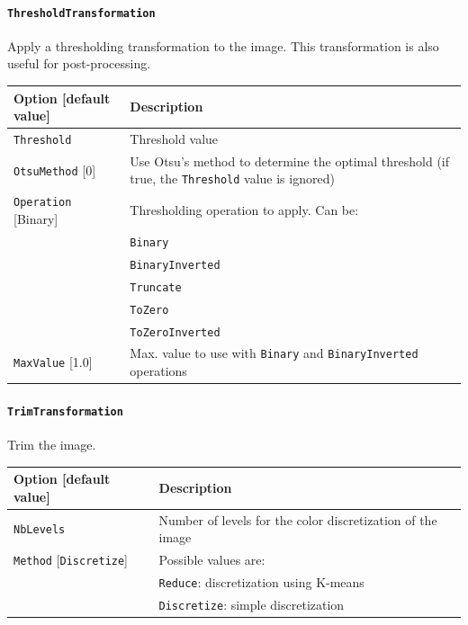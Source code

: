 \documentclass[a4paper,11pt,oneside]{article}
\begin{document}
\paragraph{\texorpdfstring{\lstinline[basicstyle=\ttfamily\bfseries]!ThresholdTransformation!}{ThresholdTransformation}}
Apply a thresholding transformation to the image.
This transformation is also useful for post-processing.

\begin{center}
 \begin{tabular}{| p{5cm} | p{10cm} | }
 \hline
 Option [default value] & Description\\
 \hline\hline
  \cellcolor{requiredcolor}\lstinline!Threshold! & Threshold value \\
  \lstinline!OtsuMethod! [0] & Use Otsu's method to determine the optimal
  threshold (if true, the \lstinline!Threshold! value is ignored) \\
  \lstinline!Operation! [Binary] & Thresholding operation to apply. Can be:\\
   & \lstinline!Binary! \\
   & \lstinline!BinaryInverted! \\
   & \lstinline!Truncate! \\
   & \lstinline!ToZero! \\
   & \lstinline!ToZeroInverted! \\
  \lstinline!MaxValue! [1.0] & Max. value to use with \lstinline!Binary! and \lstinline!BinaryInverted! operations \\
 \hline
\end{tabular}
\end{center}


\paragraph{\texorpdfstring{%
\lstinline[basicstyle=\ttfamily\bfseries]!TrimTransformation!}
{TrimTransformation}}
Trim the image.

\begin{center}
 \begin{tabular}{| p{5cm} | p{10cm} | }
 \hline
 Option [default value] & Description\\
 \hline\hline
  \cellcolor{requiredcolor}\lstinline!NbLevels! & Number of levels for the color discretization of the image \\
  \lstinline!Method! [\lstinline!Discretize!] & Possible values are: \\
   & \lstinline!Reduce!: discretization using K-means \\
   & \lstinline!Discretize!: simple discretization \\
 \hline
\end{tabular}
\end{center}
\end{document}
